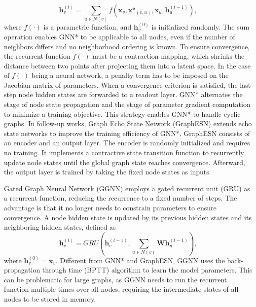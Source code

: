     \begin{equation}
    \label{eq:gnn}
    \mathbf{h}_v^{(t)} = \sum_{u\in N(v)}f(\mathbf{x}_v,\mathbf{x^e}_{(v,u)}, \mathbf{x}_{u}, \mathbf{h}^{(t-1)}_{u}),
    \end{equation}
    where $f(\cdot)$ is a parametric function, and $\mathbf{h}^{(0)}_v$ is initialized randomly. The sum operation enables GNN* to be applicable to all nodes, even if the number of neighbors differs and no neighborhood ordering is known. 
    To ensure convergence, the recurrent function $f(\cdot)$ must be a contraction mapping, which shrinks the distance between two points after projecting them into a latent space. 
    In the case of $f(\cdot)$ being a neural network, a penalty term has to be imposed on the Jacobian matrix of parameters.  
    When a convergence criterion is satisfied,  the last step node hidden states are forwarded to a readout layer. GNN* alternates the stage of node state propagation and the stage of parameter gradient computation to minimize a training objective.  This strategy enables GNN* to handle cyclic graphs.  In follow-up works,  Graph Echo State Network (GraphESN) \cite{gallicchio2010graph} extends echo state networks to improve the training efficiency of GNN*. GraphESN consists of an encoder and an output layer. The encoder is randomly initialized and requires no training. It implements a contractive state transition function to recurrently update node states until the global graph state reaches convergence. Afterward, the output layer is trained by taking the fixed node states as inputs.

    
    Gated Graph Neural Network (GGNN) \cite{li2015gated} employs a gated recurrent unit (GRU) \cite{cho2014learning} as a recurrent function, reducing the recurrence to a fixed number of steps. The advantage is that it no longer needs to constrain parameters to ensure convergence. A node hidden state is updated by its previous hidden states and its neighboring hidden states, defined as
    \begin{equation}
    \mathbf{h}_v^{(t)} = GRU(\mathbf{h}_v^{(t-1)},\sum_{u\in N(v)}\mathbf{W}\mathbf{h}_u^{(t-1)}),
    \end{equation}
    where $\mathbf{h}_v^{(0)}=\mathbf{x}_v$.
     Different from GNN* and GraphESN, GGNN uses the back-propagation through time (BPTT) algorithm to learn the model parameters.  This can be problematic for large graphs, as GGNN needs to run the recurrent function multiple times over all nodes, requiring the intermediate states of all nodes to be stored in memory.
    
